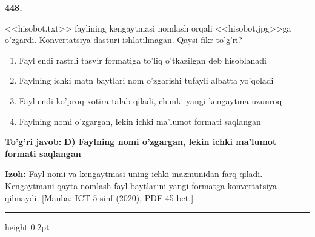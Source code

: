 \documentclass[10pt,a4paper]{article}
\begin{document}
{\bfseries\sffamily\color{ink} 448.}
\par
<<hisobot.txt>> faylining kengaytmasi nomlash orqali <<hisobot.jpg>>ga o'zgardi. Konvertatsiya dasturi ishlatilmagan. Qaysi fikr to'g'ri?
\begin{enumerate}[label=\Alph*),leftmargin=9mm]
\item Fayl endi rastrli tasvir formatiga to'liq o'tkazilgan deb hisoblanadi
\item Faylning ichki matn baytlari nom o'zgarishi tufayli albatta yo'qoladi
\item Fayl endi ko'proq xotira talab qiladi, chunki yangi kengaytma uzunroq
\item Faylning nomi o'zgargan, lekin ichki ma'lumot formati saqlangan
\end{enumerate}
\begin{tcolorbox}[enhanced,breakable,colback=teal!4,colframe=teal!60!black,boxrule=0.45pt,arc=1.2mm,left=2.7mm,right=2.7mm,top=1.8mm,bottom=1.8mm,before skip=2mm,after skip=2mm]
{\bfseries\sffamily\color{teal}To'g'ri javob:} \textbf{D) Faylning nomi o'zgargan, lekin ichki ma'lumot formati saqlangan}
\par\smallskip
{\bfseries Izoh:} Fayl nomi va kengaytmasi uning ichki mazmunidan farq qiladi. Kengaytmani qayta nomlash fayl baytlarini yangi formatga konvertatsiya qilmaydi. [Manba: ICT 5-sinf (2020), PDF 45-bet.]
\end{tcolorbox}
\vspace{2mm}\hrule height 0.2pt\vspace{3mm}
\end{document}
